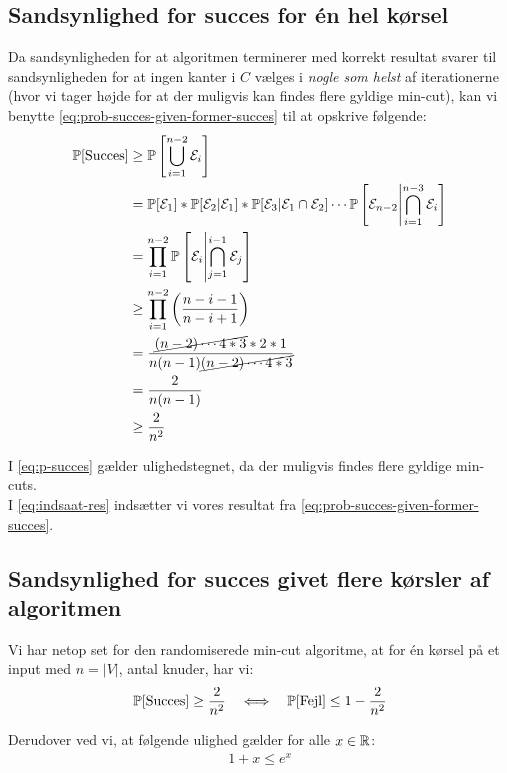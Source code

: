 \subsection{Sandsynlighed for succes for én hel kørsel}

Da sandsynligheden for at algoritmen terminerer med korrekt resultat svarer til sandsynligheden for at ingen kanter i $C$ vælges i \emph{nogle som helst} af iterationerne (hvor vi tager højde for at der muligvis kan findes flere gyldige min-cut), kan vi benytte \cref{eq:prob-succes-given-former-succes} til at opskrive følgende:
\begin{align}
    \P[\text{Succes}] &\geq \P \square{ \bigcup_{i=1}^{n-2}   \E_i} \label{eq:p-succes} \\
                      &= \P[\E_1] * \P[\E_2 | \E_1] * \P[\E_3 | \E_1 \cap \E_2] \cdots \P \square{ \E_{n-2} \middle| \bigcap_{i=1}^{n-3} \E_i } \nonumber \\
                      &= \prod_{i=1}^{n-2} \P \square{ \E_i \middle| \bigcap_{j=1}^{i-1} \E_j } \nonumber \\
                      &\geq \prod_{i=1}^{n-2} \p{ \frac{n-i-1}{n-i+1} } \label{eq:indsaat-res} \\
                      &= \frac{\cancel{(n-2) \cdots 4*3}*2*1 }{n(n-1)\cancel{(n-2) \cdots 4*3} } \nonumber \\
                      &= \frac{2}{n(n-1)} \nonumber \\
                      &\geq \frac{2}{n^2} \nonumber
\end{align}

I \cref{eq:p-succes} gælder ulighedstegnet, da der muligvis findes flere gyldige min-cuts.\\
I \cref{eq:indsaat-res} indsætter vi vores resultat fra \cref{eq:prob-succes-given-former-succes}.



\subsection{Sandsynlighed for succes givet flere kørsler af algoritmen}
Vi har netop set for den randomiserede min-cut algoritme, at for én kørsel på et input med $n = |V|$, antal knuder, har vi:
$$
\P[\text{Succes}] \geq \frac{2}{n^2} \quad \Longleftrightarrow \quad \P[\text{Fejl}] \leq 1 - \frac{2}{n^2}
$$

Derudover ved vi, at følgende ulighed gælder for alle $x \in \R$:
\begin{align} \label{eq:exp-regel}
    1 + x \leq e^x
\end{align}


